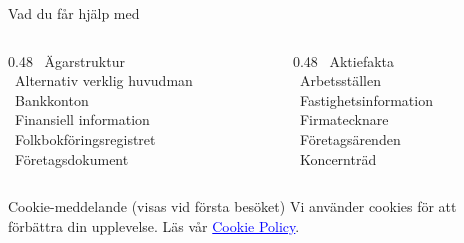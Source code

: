 \documentclass[10pt]{beamer}
\begin{document}
\begin{frame}[plain]
  \begin{block}{Vad du får hjälp med}
    \begin{columns}[T]
      \begin{column}{0.48\textwidth}
        \textbullet\ Ägarstruktur \\
        \textbullet\ Alternativ verklig huvudman \\
        \textbullet\ Bankkonton \\
        \textbullet\ Finansiell information \\
        \textbullet\ Folkbokföringsregistret \\
        \textbullet\ Företagsdokument
      \end{column}
      \begin{column}{0.48\textwidth}
        \textbullet\ Aktiefakta \\
        \textbullet\ Arbetsställen \\
        \textbullet\ Fastighetsinformation \\
        \textbullet\ Firmatecknare \\
        \textbullet\ Företagsärenden \\
        \textbullet\ Koncernträd
      \end{column}
    \end{columns}
  \end{block}

  \vspace{0.5cm}

   \hspace{0.5cm} 
  
  \vspace{1.5cm}
  
  \begin{block}{Cookie-meddelande (visas vid första besöket)}
    \footnotesize
    Vi använder cookies för att förbättra din upplevelse. Läs vår \textcolor{blue}{\underline{Cookie Policy}}.
    
    \vspace{0.3cm}
     \hspace{0.3cm} 
  \end{block}
\end{frame}
\end{document}
